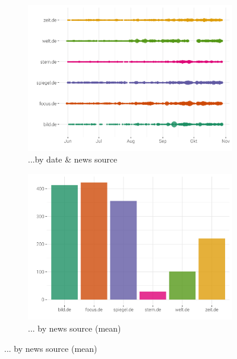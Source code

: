 \documentclass[12pt,a4paper,notitlepage]{article}
\begin{document}
\begin{figure}[H]
	\caption{Distribution of Facebook shares...}
	\begin{center}
		\begin{subfigure}[normla]{0.49\textwidth}
			\includegraphics[width=\textwidth]{../figs/fb_shares.png}
			\caption{...by date \& news source}
		\end{subfigure}
		\begin{subfigure}[normla]{0.49\textwidth}
			\includegraphics[width=\textwidth]{../figs/fb_shares_mean.png}
			\caption{... by news source (mean)}
		\end{subfigure}
	\end{center}
	\label{fig_fb_shares}
\end{figure}
\end{document}
